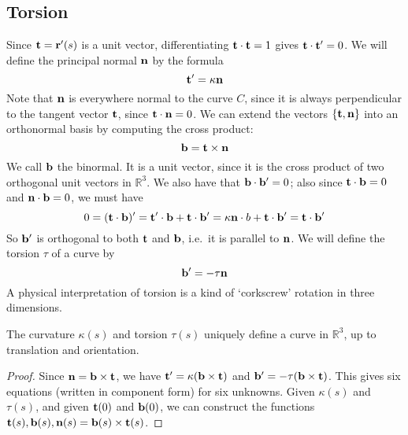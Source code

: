 \subsection{Torsion}
Since \(\vb t = \vb r'(s)\) is a unit vector, differentiating \(\vb t \cdot \vb t = 1\) gives \(\vb t \cdot \vb t' = 0\).
We will define the principal normal \(\vb n\) by the formula
\[
	\vb t' = \kappa \vb n
\]
Note that \(\vb n\) is everywhere normal to the curve \(C\), since it is always perpendicular to the tangent vector \(\vb t\), since \(\vb t \cdot \vb n = 0\).
We can extend the vectors \(\{ \vb t, \vb n \}\) into an orthonormal basis by computing the cross product:
\[
	\vb b = \vb t \times \vb n
\]
We call \(\vb b\) the binormal.
It is a unit vector, since it is the cross product of two orthogonal unit vectors in \(\mathbb R^3\).
We also have that \(\vb b \cdot \vb b' = 0\); also since \(\vb t \cdot \vb b = 0\) and \(\vb n \cdot \vb b = 0\), we must have
\[
	0 = (\vb t \cdot \vb b)' = \vb t' \cdot \vb b + \vb t \cdot \vb b' = \kappa \vb n \cdot b + \vb t \cdot \vb b' = \vb t \cdot \vb b'
\]
So \(\vb b'\) is orthogonal to both \(\vb t\) and \(\vb b\), i.e.\ it is parallel to \(\vb n\).
We will define the torsion \(\tau\) of a curve by
\[
	\vb b' = -\tau \vb n
\]
A physical interpretation of torsion is a kind of `corkscrew' rotation in three dimensions.

\begin{proposition}
	The curvature \(\kappa(s)\) and torsion \(\tau(s)\) uniquely define a curve in \(\mathbb R^3\), up to translation and orientation.
\end{proposition}
\begin{proof}
	Since \(\vb n = \vb b \times \vb t\), we have \(\vb t' = \kappa(\vb b \times \vb t)\) and \(\vb b' = -\tau(\vb b \times \vb t)\).
	This gives six equations (written in component form) for six unknowns.
	Given \(\kappa(s)\) and \(\tau(s)\), and given \(\vb t(0)\) and \(\vb b(0)\), we can construct the functions \(\vb t(s), \vb b(s), \vb n(s) = \vb b(s) \times \vb t(s)\).
\end{proof}

